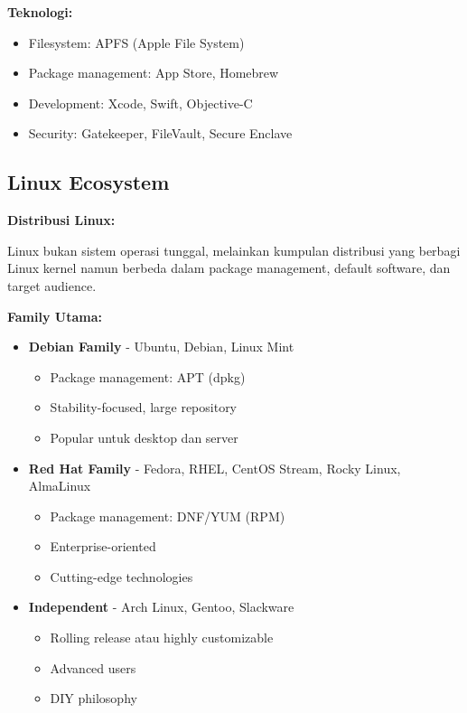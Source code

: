 \textbf{Teknologi:}
\begin{itemize}
    \item Filesystem: APFS (Apple File System)
    \item Package management: App Store, Homebrew
    \item Development: Xcode, Swift, Objective-C
    \item Security: Gatekeeper, FileVault, Secure Enclave
\end{itemize}

\subsection{Linux Ecosystem}

\textbf{Distribusi Linux:}

Linux bukan sistem operasi tunggal, melainkan kumpulan distribusi yang berbagi Linux kernel namun berbeda dalam package management, default software, dan target audience.

\textbf{Family Utama:}
\begin{itemize}
    \item \textbf{Debian Family} - Ubuntu, Debian, Linux Mint
    \begin{itemize}
        \item Package management: APT (dpkg)
        \item Stability-focused, large repository
        \item Popular untuk desktop dan server
    \end{itemize}

    \item \textbf{Red Hat Family} - Fedora, RHEL, CentOS Stream, Rocky Linux, AlmaLinux
    \begin{itemize}
        \item Package management: DNF/YUM (RPM)
        \item Enterprise-oriented
        \item Cutting-edge technologies
    \end{itemize}

    \item \textbf{Independent} - Arch Linux, Gentoo, Slackware
    \begin{itemize}
        \item Rolling release atau highly customizable
        \item Advanced users
        \item DIY philosophy
    \end{itemize}
\end{itemize}

